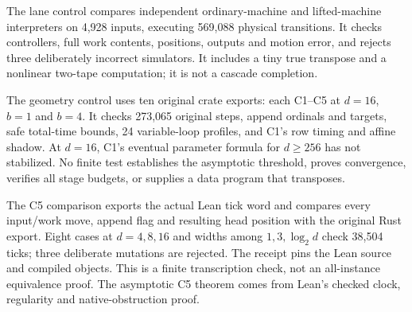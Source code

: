 The lane control compares independent ordinary-machine and lifted-machine
interpreters on 4,928 inputs, executing 569,088 physical transitions. It
checks controllers, full work contents, positions, outputs and motion
error, and rejects three deliberately incorrect simulators. It includes
a tiny true transpose and a nonlinear two-tape computation; it is not a
cascade completion.

The geometry control uses ten original crate exports: each C1--C5 at
$d=16$, $b=1$ and $b=4$. It checks 273,065 original steps, append ordinals
and targets, safe total-time bounds, 24 variable-loop profiles, and C1's
row timing and affine shadow. At $d=16$, C1's eventual parameter formula
for $d\ge256$ has not stabilized. No finite test establishes the
asymptotic threshold, proves convergence, verifies all stage budgets,
or supplies a data program that transposes.

The C5 comparison exports the actual Lean tick word and compares every
input/work move, append flag and resulting head position with the original
Rust export. Eight cases at $d=4,8,16$ and widths among $1,3,\log_2d$
check 38,504 ticks; three deliberate mutations are rejected. The receipt
pins the Lean source and compiled objects. This is a finite transcription
check, not an all-instance equivalence proof. The asymptotic C5 theorem
comes from Lean's checked clock, regularity and native-obstruction proof.



